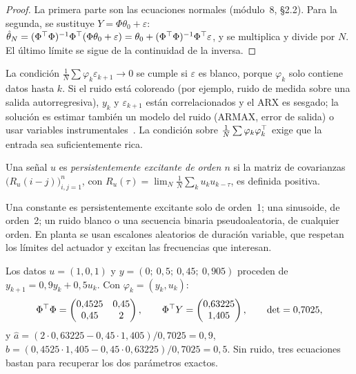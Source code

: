 \begin{proof}
La primera parte son las ecuaciones normales (módulo~8, §2.2). Para la segunda, se sustituye $Y=\Phi\theta_0+\varepsilon$: $\hat\theta_N=(\Phi^{\top}\Phi)^{-1}\Phi^{\top}(\Phi\theta_0+\varepsilon)=\theta_0+(\Phi^{\top}\Phi)^{-1}\Phi^{\top}\varepsilon$, y se multiplica y divide por $N$. El último límite se sigue de la continuidad de la inversa.
\end{proof}

La condición $\frac1N\sum\varphi_k\varepsilon_{k+1}\to0$ se cumple si $\varepsilon$ es blanco, porque $\varphi_k$ solo contiene datos hasta $k$. Si el ruido está coloreado (por ejemplo, ruido de medida sobre una salida autorregresiva), $y_k$ y $\varepsilon_{k+1}$ están correlacionados y el ARX es sesgado; la solución es estimar también un modelo del ruido (ARMAX, error de salida) o usar variables instrumentales~\cite{ljung}. La condición sobre $\frac1N\sum\varphi_k\varphi_k^{\top}$ exige que la entrada sea suficientemente rica.

\begin{definicion}\label{def:pe}
Una señal $u$ es \emph{persistentemente excitante de orden $n$} si la matriz de covarianzas $\bigl(R_u(i-j)\bigr)_{i,j=1}^{n}$, con $R_u(\tau)=\lim_N\frac1N\sum_ku_ku_{k-\tau}$, es definida positiva.
\end{definicion}

Una constante es persistentemente excitante solo de orden~1; una sinusoide, de orden~2; un ruido blanco o una secuencia binaria pseudoaleatoria, de cualquier orden. En planta se usan escalones aleatorios de duración variable, que respetan los límites del actuador y excitan las frecuencias que interesan.

\begin{ejemplo}\label{ej:arx-mano}
Los datos $u=(1,0,1)$ y $y=(0;\ 0{,}5;\ 0{,}45;\ 0{,}905)$ proceden de $y_{k+1}=0{,}9y_k+0{,}5u_k$. Con $\varphi_k=(y_k,u_k)$:
\[
\Phi^{\top}\Phi=\begin{pmatrix}0{,}4525&0{,}45\\0{,}45&2\end{pmatrix},\qquad \Phi^{\top} Y=\begin{pmatrix}0{,}63225\\1{,}405\end{pmatrix},\qquad \det=0{,}7025,
\]
y $\hat a=(2\cdot0{,}63225-0{,}45\cdot1{,}405)/0{,}7025=0{,}9$, $\hat b=(0{,}4525\cdot1{,}405-0{,}45\cdot0{,}63225)/0{,}7025=0{,}5$. Sin ruido, tres ecuaciones bastan para recuperar los dos parámetros exactos.
\end{ejemplo}

